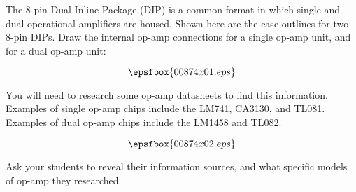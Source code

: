 

The 8-pin Dual-Inline-Package (DIP) is a common format in which single and dual operational amplifiers are housed.  Shown here are the case outlines for two 8-pin DIPs.  Draw the internal op-amp connections for a single op-amp unit, and for a dual op-amp unit:

$$\epsfbox{00874x01.eps}$$

You will need to research some op-amp datasheets to find this information.  Examples of single op-amp chips include the LM741, CA3130, and TL081.  Examples of dual op-amp chips include the LM1458 and TL082.







$$\epsfbox{00874x02.eps}$$







Ask your students to reveal their information sources, and what specific models of op-amp they researched.




